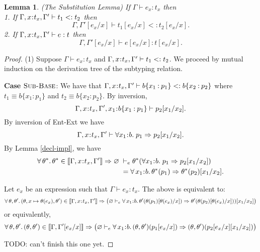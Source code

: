 \documentclass[11pt]{article}
\newtheorem{lemma}[theorem]{Lemma}
\newcommand{\bind}{\hspace{0.05em}{:}\hspace{0.05em}} %
\newcommand{\col}{\mathbin{:}}       %
\newcommand{\lb}{\llbracket}         %
\newcommand{\rb}{\rrbracket}         %
\newcommand{\many}{\hookrightarrow^*}
\newcommand{\true}{\mathtt{true}}
\begin{document}
\begin{lemma}(The Substitution Lemma) If $\Gamma \vdash e_x : t_x$ then\\
1. If $\Gamma, x\bind t_x, \Gamma' \vdash t_1 <: t_2$ then
\[
\Gamma, \Gamma'[e_x/x] \vdash t_1[e_x/x] <: t_2[e_x/x].
\]
2. If $\Gamma, x\bind t_x, \Gamma' \vdash e : t$ then
\[
\Gamma, \Gamma'[e_x/x] \vdash e[e_x/x] : t[e_x/x].
\]
\end{lemma}
\begin{proof}
(1) Suppose $\Gamma \vdash e_x:t_x$ and $\Gamma, x\bind t_x ,\Gamma' \vdash t_1 <: t_2$. We proceed by mutual induction on the derivation tree of the subtyping relation.

{\bf Case} $\textsc{Sub-Base}$: We have that 
$\Gamma,x\bind t_x,\Gamma' \vdash b\{x_1\col p_1\} <: b\{x_2\col p_2\}$ where $t_1 \equiv b\{x_1\col p_1\}$ and $t_2 \equiv b\{x_2\col p_2\}$.
By inversion, 
\[\Gamma,x\bind t_x,\Gamma',x_1\bind b\{x_1\col p_1\} \vdash p_2[x_1/x_2].\] 
By inversion of {\sc Ent-Ext} we have 
\begin{equation}\label{311}
\Gamma,x\bind t_x,\Gamma' \vdash \forall x_1\bind b.\; p_1 \Rightarrow p_2[x_1/x_2].\end{equation}
By Lemma \ref{decl-impl}, we have
\begin{align}
\forall\, \theta^*.\, \theta^* \in \lb \Gamma,x\bind t_x,\Gamma'\rb \Rightarrow \varnothing \;&\vdash_e \theta^*(\forall x_1\bind b.\; p_1 \Rightarrow p_2[x_1/x_2]) \\
&= \forall\, x_1\bind b.\, \theta^*(p_1) \Rightarrow \theta^*(p_2)[x_1/x_2].
\end{align}

Let $e_x$ be an expression such that $\Gamma \vdash e_x : t_x$.
The above is equivalent to:
\[
\forall\, \theta, \theta'.\, (\theta, x \mapsto \theta(e_x), \theta') \in \lb\Gamma, x\bind t_x, \Gamma'\rb \Rightarrow \big( \varnothing \vdash_e
\forall\, x_1\bind b.\, \theta'(\theta(p_1)[\theta(e_x)/x]) \Rightarrow \theta'(\theta(p_2)[\theta(e_x)/x]))[x_1/x_2] \big)
\]
or equivalently,
\begin{equation}
\forall\, \theta, \theta'.\, (\theta, \theta') \in \lb\Gamma, \Gamma'[e_x/x]\rb \Rightarrow \big(\varnothing \vdash_e
\forall\, x_1\bind b.\, (\theta, \theta')(p_1[e_x/x]) \Rightarrow (\theta,\theta')(p_2[e_x/x][x_1/x_2])\big)
\end{equation}

TODO: can't finish this one yet.
\begin{comment}
The validity of the implication in (\ref{311}) means that
\begin{equation}\label{312}
\forall\theta^*. \theta^*\in\lb\Gamma,x:t_x,\Gamma',v_1:b\rb \Rightarrow
(\theta^*(p_1)\many\true)\Rightarrow(\theta^*(p_2[v_1/v_2])\many\true)
\end{equation}


\end{comment}
\end{proof}
\end{document}
